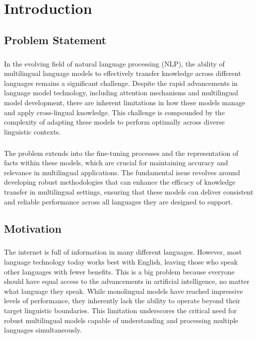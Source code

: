 \chapter{Introduction}\label{chp: Introduction}
\section{Problem Statement}\label{sec: Problem Definition}
\paragraph{} In the evolving field of natural language processing (NLP), the ability of multilingual language models to effectively transfer knowledge across different languages remains a significant challenge. Despite the rapid advancements in language model technology, including attention mechanisms and multilingual model development, there are inherent limitations in how these models manage and apply cross-lingual knowledge. This challenge is compounded by the complexity of adapting these models to perform optimally across diverse linguistic contexts.

\paragraph{} The problem extends into the fine-tuning processes and the representation of facts within these models, which are crucial for maintaining accuracy and relevance in multilingual applications. The fundamental issue revolves around developing robust methodologies that can enhance the efficacy of knowledge transfer in multilingual settings, ensuring that these models can deliver consistent and reliable performance across all languages they are designed to support.

\section{Motivation}\label{sec: Motivation}
\paragraph{} The internet is full of information in many different languages. However, most language technology today works best with English, leaving those who speak other languages with fewer benefits. This is a big problem because everyone should have equal access to the advancements in artificial intelligence, no matter what language they speak. While monolingual models have reached impressive levels of performance, they inherently lack the ability to operate beyond their target linguistic boundaries. This limitation underscores the critical need for robust multilingual models capable of understanding and processing multiple languages simultaneously.

